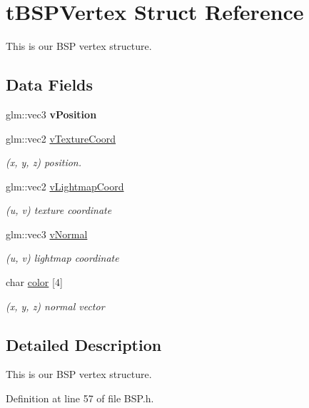 \hypertarget{structt_b_s_p_vertex}{}\section{t\+B\+S\+P\+Vertex Struct Reference}
\label{structt_b_s_p_vertex}


This is our B\+SP vertex structure.  


\subsection*{Data Fields}
\begin{DoxyCompactItemize}
\item 
glm\+::vec3 {\bfseries v\+Position}\hypertarget{structt_b_s_p_vertex_a8a4672a51587c09af496a7c37fbebec8}{}\label{structt_b_s_p_vertex_a8a4672a51587c09af496a7c37fbebec8}

\item 
glm\+::vec2 \hyperlink{structt_b_s_p_vertex_ad5c115ffa138edf2348a6075ca9c5692}{v\+Texture\+Coord}\hypertarget{structt_b_s_p_vertex_ad5c115ffa138edf2348a6075ca9c5692}{}\label{structt_b_s_p_vertex_ad5c115ffa138edf2348a6075ca9c5692}

\begin{DoxyCompactList}\small\item\em (x, y, z) position. \end{DoxyCompactList}\item 
glm\+::vec2 \hyperlink{structt_b_s_p_vertex_aabf77ca7081e0acc883151b48fa27252}{v\+Lightmap\+Coord}\hypertarget{structt_b_s_p_vertex_aabf77ca7081e0acc883151b48fa27252}{}\label{structt_b_s_p_vertex_aabf77ca7081e0acc883151b48fa27252}

\begin{DoxyCompactList}\small\item\em (u, v) texture coordinate \end{DoxyCompactList}\item 
glm\+::vec3 \hyperlink{structt_b_s_p_vertex_ac8627a246451fceb050ae35c5899fdb5}{v\+Normal}\hypertarget{structt_b_s_p_vertex_ac8627a246451fceb050ae35c5899fdb5}{}\label{structt_b_s_p_vertex_ac8627a246451fceb050ae35c5899fdb5}

\begin{DoxyCompactList}\small\item\em (u, v) lightmap coordinate \end{DoxyCompactList}\item 
char \hyperlink{structt_b_s_p_vertex_ad1402b3a5cd9cc95f06d676a4f9cafcc}{color} \mbox{[}4\mbox{]}\hypertarget{structt_b_s_p_vertex_ad1402b3a5cd9cc95f06d676a4f9cafcc}{}\label{structt_b_s_p_vertex_ad1402b3a5cd9cc95f06d676a4f9cafcc}

\begin{DoxyCompactList}\small\item\em (x, y, z) normal vector \end{DoxyCompactList}\end{DoxyCompactItemize}


\subsection{Detailed Description}
This is our B\+SP vertex structure. 

Definition at line 57 of file B\+S\+P.\+h.

